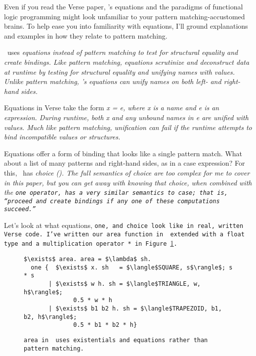 \documentclass[manuscript,screen,review, 12pt, nonacm]{acmart}
\begin{document}
    Even if you read the Verse paper, \VC's equations and the paradigms of
    functional logic programming might look unfamiliar to your pattern
    matching-accustomed brains. To help ease you into familiarity with
    equations, I'll ground explanations and examples in how they relate to
    pattern matching. 

    \VC\ uses \it{equations} instead of pattern matching to test for structural
    equality and create bindings. Like pattern matching, equations scrutinize
    and deconstruct data at runtime by testing for structural equality and
    unifying names with values. Unlike pattern matching, \VC's equations can
    unify names on both left- \it{and} right-hand sides. 

    Equations in Verse take the form \it{x = e}, where \it{x} is a name and
    \it{e} is an expression. During runtime, both \it{x} and any unbound names
    in \it{e} are unified with values. Much like pattern matching, unification
    can fail if the runtime attempts to bind incompatible values or structures. 

    Equations offer a form of binding that looks like a single pattern match.
    What about a list of many patterns and right-hand sides, as in a case
    expression? For this, \VC\ has \it{choice} (\choice). The full semantics of
    choice are too complex for me to cover in this paper, but you can get away
    with knowing that choice, when combined with the \tt{one} operator, has a
    very similar semantics to case; that is, “proceed and create bindings if any
    one of these computations succeed.” 

    Let's look at what equations, \tt{one}, and choice look like in real,
    written Verse code. I've written our \tt{area} function in \VC\ extended
    with a \tt{float} type and a multiplication operator \tt{*} in
    Figure~\ref{fig:versearea}. 

    \begin{figure}[]
        \verselst
        \begin{lstlisting}[numbers=none]
$\exists$ area. area = $\lambda$ sh. 
  one {  $\exists$ x. sh   = $\langle$SQUARE, s$\rangle$; s * s
       | $\exists$ w h. sh = $\langle$TRIANGLE, w, h$\rangle$; 
              0.5 * w * h
       | $\exists$ b1 b2 h. sh = $\langle$TRAPEZOID, b1, b2, h$\rangle$; 
              0.5 * b1 * b2 * h}
        \end{lstlisting}
    \caption{\tt{area} in \VC\ uses existentials and equations rather than
    pattern matching.} 
    \label{fig:versearea}
    \end{figure}
\end{document}

